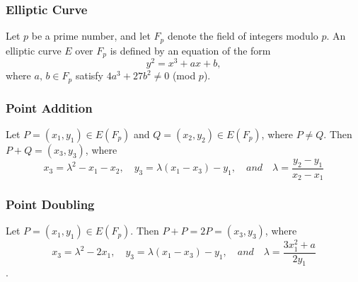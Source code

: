 \documentclass[12pt,a4paper]{article}
\begin{document}
\subsubsection{Elliptic Curve} \label{Elliptic Curve}
Let $p$ be a prime number, and let $F_p$ denote the field of integers modulo $p$. 
An elliptic curve $E$ over $F_p$ is defined by an equation of the form
\begin{equation}
y^2 = x^3 + ax + b,
\end{equation}
where $a,\, b \in F_p$ satisfy $4a^3 + 27b^2 \ne 0$ (mod $ p$).

\subsubsection{Point Addition} \label{Point Addition}
Let $P = (x_1,y_1) \in E(F_p)$ and $Q = (x_2,y_2) \in E(F_p)$, where $P \neq Q$. 
Then $P + Q = (x_3,y_3)$, where
\begin{equation}
    x_3 = \lambda^2 - x_1 - x_2, \quad y_3 = \lambda(x_1 - x_3) - y_1, \quad and \quad \lambda = \frac{y_2-y_1}{x_2-x_1}
\end{equation}

\subsubsection{Point Doubling} \label{Point Doubling}
Let $P = (x_1,y_1) \in E(F_p)$. 
Then $P + P = 2P = (x_3,y_3)$, where
\begin{equation}
    x_3 = \lambda^2 - 2x_1, \quad y_3 = \lambda(x_1 - x_3) - y_1, \quad and \quad \lambda = \frac{3x_1^2 + a}{2y_1}
\end{equation}
\cite{hankerson2003guide,lopez2000overview}.

\vspace{5mm}
\end{document}
